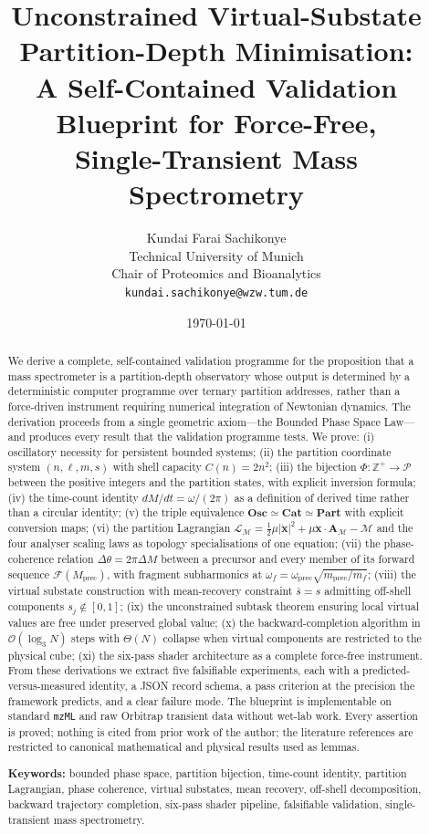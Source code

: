 \documentclass[twocolumn,10pt,a4paper]{article}
\title{\textbf{Unconstrained Virtual-Substate Partition-Depth Minimisation:\\
A Self-Contained Validation Blueprint for Force-Free,\\
Single-Transient Mass Spectrometry}}
\author{
Kundai Farai Sachikonye\\
Technical University of Munich\\
Chair of Proteomics and Bioanalytics\\
\texttt{kundai.sachikonye@wzw.tum.de}
}
\date{\today}
\theoremstyle{thmstyle}
\theoremstyle{definition}
\theoremstyle{remark}
\newcommand{\Zp}{\mathbb{Z}^{+}}
\newcommand{\Parts}{\mathcal{P}}
\newcommand{\PhiMap}{\varPhi}
\newcommand{\Depth}{\mathcal{M}}
\newcommand{\Lagr}{\mathcal{L}}
\newcommand{\Apartition}{\mathbf{A}_{\Depth}}
\newcommand{\partinert}{\mu}
\newcommand{\calF}{\mathcal{F}}
\begin{document}
\maketitle

\begin{abstract}
\noindent
We derive a complete, self-contained validation programme for the
proposition that a mass spectrometer is a partition-depth observatory
whose output is determined by a deterministic computer programme over
ternary partition addresses, rather than a force-driven instrument
requiring numerical integration of Newtonian dynamics. The derivation
proceeds from a single geometric axiom---the Bounded Phase Space
Law---and produces every result that the validation programme tests.
We prove: (i) oscillatory necessity for persistent bounded systems;
(ii) the partition coordinate system $(n,\ell,m,s)$ with shell capacity
$C(n)=2n^{2}$; (iii) the bijection $\PhiMap:\Zp\to\Parts$ between the
positive integers and the partition states, with explicit
inversion formula; (iv) the time-count identity
$dM/dt=\omega/(2\pi)$ as a definition of derived time rather than a
circular identity; (v) the triple equivalence
$\mathbf{Osc}\simeq\mathbf{Cat}\simeq\mathbf{Part}$ with explicit
conversion maps; (vi) the partition Lagrangian
$\Lagr_{\Depth}=\tfrac{1}{2}\partinert|\dot{\mathbf{x}}|^{2}+\partinert\dot{\mathbf{x}}\cdot\Apartition-\Depth$
and the four analyser scaling laws as topology specialisations of one
equation; (vii) the phase-coherence relation
$\Delta\theta=2\pi\Delta M$ between a precursor and every member of its
forward sequence $\calF(M_{\mathrm{prec}})$, with fragment subharmonics
at $\omega_{f}=\omega_{\mathrm{prec}}\sqrt{m_{\mathrm{prec}}/m_{f}}$;
(viii) the virtual substate construction with mean-recovery constraint
$\bar{s}=s$ admitting off-shell components $s_{j}\notin[0,1]$; (ix) the
unconstrained subtask theorem ensuring local virtual values are free
under preserved global value; (x) the backward-completion algorithm in
$\mathcal{O}(\log_{3}N)$ steps with $\Theta(N)$ collapse when virtual
components are restricted to the physical cube; (xi) the six-pass
shader architecture as a complete force-free instrument. From these
derivations we extract five falsifiable experiments, each with a
predicted-versus-measured identity, a JSON record schema, a pass
criterion at the precision the framework predicts, and a clear failure
mode. The blueprint is implementable on standard \texttt{mzML} and raw
Orbitrap transient data without wet-lab work. Every assertion is
proved; nothing is cited from prior work of the author; the
literature references are restricted to canonical mathematical and
physical results used as lemmas.

\medskip
\noindent\textbf{Keywords:} bounded phase space, partition bijection,
time-count identity, partition Lagrangian, phase coherence, virtual
substates, mean recovery, off-shell decomposition, backward trajectory
completion, six-pass shader pipeline, falsifiable validation,
single-transient mass spectrometry.
\end{abstract}
\end{document}
